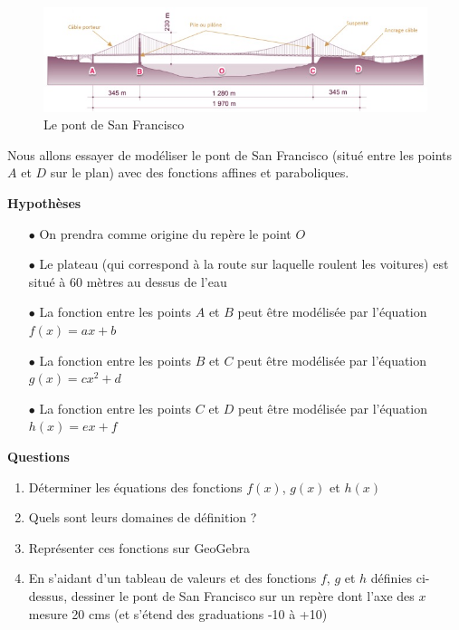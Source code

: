 \documentclass[a4paper,12pt]{article}
\begin{document}
  \begin{figure}[H]
    \centering
    \includegraphics[width=\linewidth]{pont_san_francisco.jpg}
    \caption{\label{} Le pont de San Francisco}
\end{figure}

Nous allons essayer de modéliser le pont de San Francisco (situé entre les points \(A\) et \(D\) sur le plan) avec des fonctions affines et paraboliques. \par
\vspace{1em}
\textbf{Hypothèses}
\begin{itemize}[noitemsep]
  \item[$\bullet$] On prendra comme origine du repère le point \(O\)
  \item[$\bullet$] Le plateau (qui correspond à la route sur laquelle roulent les voitures) est situé à 60 mètres au dessus de l'eau
  \item[$\bullet$] La fonction entre les points \(A\) et \(B\) peut être modélisée par l'équation \(f(x) = ax+b\)
  \item[$\bullet$] La fonction entre les points \(B\) et \(C\) peut être modélisée par l'équation \(g(x) = cx^2+d\)
  \item[$\bullet$] La fonction entre les points \(C\) et \(D\) peut être modélisée par l'équation \(h(x) = ex+f\) 
\end{itemize}

\textbf{Questions}

\begin{enumerate}[noitemsep, label=(\arabic*)]
  \item Déterminer les équations des fonctions \(f(x)\), \(g(x)\) et \(h(x)\)
  \item Quels sont leurs domaines de définition ?
  \item Représenter ces fonctions sur GeoGebra
  \item En s'aidant d'un tableau de valeurs et des fonctions \(f\), \(g\) et \(h\) définies ci-dessus, dessiner le pont de San Francisco sur un repère dont l'axe des \(x\) mesure 20 cms (et s'étend des graduations -10 à +10)
\end{enumerate}
\end{document}
